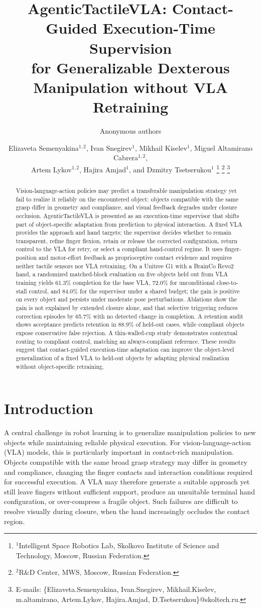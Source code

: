 \documentclass[letterpaper,10pt,conference]{ieeeconf}
\title{\LARGE\bf
AgenticTactileVLA: Contact-Guided Execution-Time Supervision \\
for Generalizable Dexterous Manipulation without VLA Retraining
}
\author{Anonymous authors}
\author{
Elizaveta Semenyakina$^{1,2}$,
Ivan Snegirev$^{1}$,
Mikhail Kiselev$^{1}$,
Miguel Altamirano Cabrera$^{1,2}$,\\
Artem Lykov$^{1,2}$,
Hajira Amjad$^{1}$,
and Dzmitry Tsetserukou$^{1}$
\thanks{$^{1}$Intelligent Space Robotics Lab, Skolkovo Institute of Science
and Technology, Moscow, Russian Federation.}
\thanks{$^{2}$R\&D Center, MWS, Moscow, Russian Federation.}
\thanks{E-mails:
\{Elizaveta.Semenyakina, Ivan.Snegirev, Mikhail.Kiselev,
m.altamirano, Artem.Lykov, Hajira.Amjad,
D.Tsetserukou\}@skoltech.ru.}
}
\begin{document}

\maketitle
\thispagestyle{empty}
\pagestyle{empty}

\begin{abstract}
Vision-language-action policies may predict a transferable manipulation
strategy yet fail to realize it reliably on the encountered object: objects
compatible with the same grasp differ in geometry and compliance, and visual
feedback degrades under closure occlusion. AgenticTactileVLA is presented as an
execution-time supervisor that shifts part of object-specific adaptation from
prediction to physical interaction. A fixed VLA provides the approach and hand
targets; the supervisor decides whether to remain transparent, refine finger
flexion, retain or release the corrected configuration, return control to the
VLA for retry, or select a compliant hand-control regime. It uses
finger-position and motor-effort feedback as proprioceptive contact evidence
and requires neither tactile sensors nor VLA retraining. On a Unitree G1 with
a BrainCo Revo2 hand, a randomized matched-block evaluation on five objects
held out from VLA training yields 61.3\% completion for the base VLA, 72.0\%
for unconditional close-to-stall control, and 84.0\% for the supervisor under
a shared budget; the gain is positive on every object and persists under
moderate pose perturbations. Ablations show the gain is not explained by
extended closure alone, and that selective triggering reduces correction
episodes by 65.7\% with no detected change in completion. A retention audit
shows acceptance predicts retention in 88.9\% of held-out cases, while
compliant objects expose conservative false rejection. A thin-walled-cup
study demonstrates contextual routing to compliant control, matching an
always-compliant reference. These results suggest that contact-guided execution-time adaptation can improve the object-level generalization of a fixed VLA to held-out objects by adapting physical realization without object-specific retraining.
\end{abstract}

\section{Introduction}

A central challenge in robot learning is to generalize manipulation policies
to new objects while maintaining reliable physical execution. For
vision-language-action (VLA) models, this is particularly important in
contact-rich manipulation. Objects compatible with the same broad grasp
strategy may differ in geometry and compliance, changing the finger contacts
and interaction conditions required for successful execution. A VLA may
therefore generate a suitable approach yet still leave fingers without
sufficient support, produce an unsuitable terminal hand configuration, or
over-compress a fragile object. Such failures are difficult to resolve visually
during closure, when the hand increasingly occludes the contact region.
\end{document}
